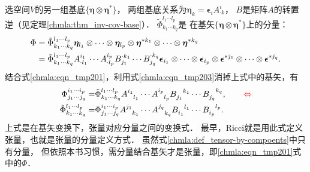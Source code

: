 选空间$V$的另一组基底$\{\boldsymbol{\eta}\otimes\boldsymbol{\eta}^{*}\}$，
两组基底关系为$\boldsymbol{\eta}_k = \boldsymbol{\epsilon}_i A_{\cdot k} ^i$，
$B$是矩阵$A$的转置逆（见定理\ref{chmla:thm_inv-cov-base}）．
$\tilde{\Phi}^{l_1 \cdots l_p} _{k_1 \cdots k_q}$是
在基矢$\{\boldsymbol{\eta}\otimes\boldsymbol{\eta}^{*}\}$上的分量：
\begin{align*}
    \Phi &= \tilde{\Phi}_{k_1 \cdots k_q} ^{l_1 \cdots l_p}
    \boldsymbol{\eta}_{l_1} \otimes\cdots\otimes \boldsymbol{\eta}_{l_p} \otimes
    \boldsymbol{\eta}^{*k_1} \otimes\cdots\otimes \boldsymbol{\eta}^{*k_q} \notag \\
    &= \tilde{\Phi}_{k_1 \cdots k_q} ^{l_1 \cdots l_p}
    A_{\cdot l_1} ^{i_1}\cdots A_{\cdot l_p} ^{i_p}
    B_{j_1}^{\cdot k_1} \cdots B_{j_q}^{\cdot k_q}
    \boldsymbol{\epsilon}_{i_1} \otimes\cdots\otimes \boldsymbol{\epsilon}_{i_p} \otimes
    \boldsymbol{\epsilon}^{*j_1} \otimes\cdots\otimes \boldsymbol{\epsilon}^{*j_q} .
\end{align*}
结合式\eqref{chmla:eqn_tmp201}，利用式\eqref{chmla:eqn_tmp203}消掉上式中的基矢，有
\begin{subequations}\label{chmla:def_tensor-by-compoents}
\begin{align}
	\Phi^{i_1 \cdots i_p} _{j_1 \cdots j_q} = & \tilde{\Phi}_{k_1 \cdots k_q} ^{l_1 \cdots l_p}
	A_{\hphantom{i_1} l_1} ^{i_1}\cdots A_{\hphantom{i_p} l_p} ^{i_p}
	B_{j_1}^{\hphantom{j_1} k_1} \cdots B_{j_q}^{\hphantom{j_q} k_q},
	\qquad {\color{red} \Leftrightarrow } \\
    \tilde{\Phi}^{l_1 \cdots l_p} _{k_1 \cdots k_q} =& \Phi^{i_1 \cdots i_p} _{j_1 \cdots j_q}
      A_{\hphantom{j_1} k_1}^{j_1} \cdots A_{\hphantom{j_q} k_q}^{j_q}  
      B_{i_1}^{\hphantom{i_1} l_1} \cdots B_{i_p}^{\hphantom{i_p} l_p} . 
\end{align}
\end{subequations}
上式是在基矢变换下，张量对应分量之间的变换式．  
最早，Ricci就是用此式定义张量，也就是张量的分量定义方式．
虽然式\eqref{chmla:def_tensor-by-compoents}中只有分量，
但依照本书习惯，需分量结合基矢才是张量，即\eqref{chmla:eqn_tmp201}式中的$\Phi$．

